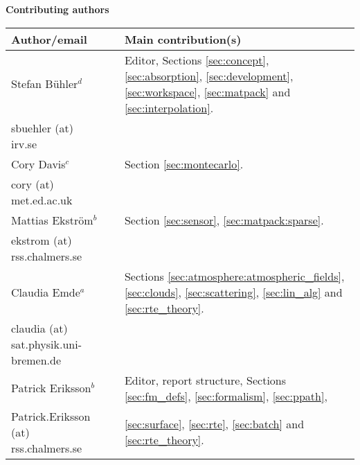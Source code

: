 %
\newpage
\thispagestyle{plain}
%
\begin{center}

{\Large \bf Contributing authors}
\vspace*{20mm}

\begin{tabular}{lp{10mm}l}
\hline
{\bf Author/email} & & {\bf Main contribution(s)} \\
\hline
  Stefan B\"uhler$^d$ & & Editor, Sections \ref{sec:concept},  
     \ref{sec:absorption}, \ref{sec:development}, \ref{sec:workspace},
     \ref{sec:matpack} and \ref{sec:interpolation}.\\
  sbuehler (at) irv.se & &        \\
\hline
  Cory Davis$^c$ & & Section \ref{sec:montecarlo}. \\
  cory (at) met.ed.ac.uk & & \\
\hline
  Mattias Ekstr\"om$^b$ & & Section \ref{sec:sensor}, 
     \ref{sec:matpack:sparse}. \\
  ekstrom (at) rss.chalmers.se & & \\
\hline
 Claudia Emde$^a$ & & Sections  \ref{sec:atmosphere:atmospheric_fields},
 \ref{sec:clouds}, \ref{sec:scattering},
 \ref{sec:lin_alg} and \ref{sec:rte_theory}.\\
 claudia (at) sat.physik.uni-bremen.de & & \\
\hline
  Patrick Eriksson$^b$ &  & Editor, report structure, 
    Sections \ref{sec:fm_defs}, \ref{sec:formalism}, \ref{sec:ppath}, \\
  Patrick.Eriksson (at) rss.chalmers.se & & 
    \ref{sec:surface}, \ref{sec:rte}, \ref{sec:batch} and 
    \ref{sec:rte_theory}.\\


\end{tabular}
\end{center}
